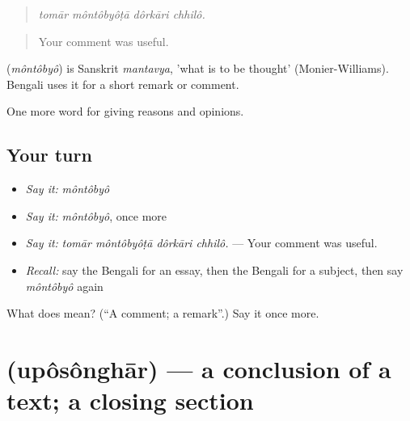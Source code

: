 \begin{quote}
   
\end{quote}

\begin{quote}
\emph{tomār môntôbyôṭā dôrkāri chhilô.}
\end{quote}

\begin{quote}
Your comment was useful.
\end{quote}

\begin{cousinweb}
\textbf{} (\emph{môntôbyô}) is Sanskrit \emph{mantavya}, 'what is to be thought' (Monier-Williams). Bengali uses it for a short remark or comment.
\end{cousinweb}

\begin{grammarlens}[title={What you've built}]
One more word for giving reasons and opinions.
\end{grammarlens}

\subsection*{Your turn}
\begin{itemize}
\raggedright
  \item \emph{Say it:} \emph{môntôbyô}
  \item \emph{Say it:} \emph{môntôbyô}, once more
  \item \emph{Say it:} \emph{tomār môntôbyôṭā dôrkāri chhilô.} — Your comment was useful.
  \item \emph{Recall:} say the Bengali for an essay, then the Bengali for a subject, then say \emph{môntôbyô} again
\end{itemize}

\begin{tcolorbox}[breakable,colback=teal!4,colframe=teal!35!black,title={Before you move on}]
What does  mean? (\textquotedblleft{}A comment; a remark\textquotedblright{}.) Say it once more.
\end{tcolorbox}
\section[\texorpdfstring{\bn{উপসংহার} (upôsônghār)}{উপসংহার (upôsônghār)}]{ (upôsônghār) — a conclusion of a text; a closing section}

\label{lesson:BN-C357-uposonghar}




